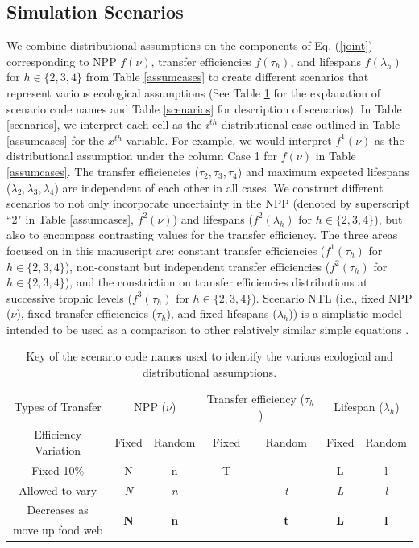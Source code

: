 \documentclass[oneside,12pt,final]{sty/ucthesis-CA2012}
\let\cite\citep                             %
\begin{document}
\begin{mainmatter}
\subsection{Simulation Scenarios}
We combine distributional assumptions on the components of Eq. (\ref{joint}) corresponding to NPP $f(\nu)$, transfer efficiencies $f(\tau_h)$, and lifespans $f(\lambda_h)$ for $h \in \{2, 3, 4\}$ from Table \ref{assumcases} to create different scenarios that represent various ecological assumptions (See Table \ref{scenariosids} for the explanation of scenario code names and Table \ref{scenarios} for description of scenarios). In Table \ref{scenarios}, we interpret each cell as the $i^{th}$ distributional case outlined in Table \ref{assumcases} for the $x^{th}$ variable. For example, we would interpret $f^1(\nu)$ as the distributional assumption under the column Case 1 for $f(\nu)$ in Table \ref{assumcases}. The transfer efficiencies ($\tau_2, \tau_3, \tau_4$) and maximum expected lifespans ($\lambda_2, \lambda_3, \lambda_4$) are independent of each other in all cases. We construct different scenarios to not only incorporate uncertainty in the NPP (denoted by superscript ``2" in Table \ref{assumcases}, $f^2(\nu)$) and lifespans ($f^2(\lambda_h)$ for $h \in \{2, 3, 4\}$), but also to encompass contrasting values for the transfer efficiency. The three areas focused on in this manuscript are: constant transfer efficiencies ($f^1(\tau_h)$ for $h \in \{2, 3, 4\}$), non-constant but independent transfer efficiencies ($f^2(\tau_h)$ for $h \in \{2, 3, 4\}$), and the constriction on transfer efficiencies distributions at successive trophic levels ($f^3(\tau_h)$ for $h \in \{2, 3, 4\}$). Scenario NTL (i.e., fixed NPP ($\nu$), fixed transfer efficiencies ($\tau_h$), and fixed lifespans ($\lambda_h$)) is a simplistic model intended to be used as a comparison to other relatively similar simple equations \cite{pauly1995primary, cury2005trophodynamic, chassot2010global, watson2014primary}. 

\begin{table}[H]
\centering
\caption{Key of the scenario code names used to identify the various ecological and distributional assumptions.}
\begin{tabular}{|c|cc|cc|cc|}
  \hline Types of Transfer  & \multicolumn{2}{c|}{NPP ($\nu$)} & \multicolumn{2}{c|}{Transfer efficiency ($\tau_h$)}  &  \multicolumn{2}{c|}{Lifespan ($\lambda_h$)}  \\ 
   Efficiency Variation & Fixed & Random & Fixed & Random & Fixed & Random  \\
    \hline
  Fixed 10\% & N & n & T &   & L & l \\
  Allowed to vary & \textit{N} & \textit{n} & & \textit{t} & \textit{L} & \textit{l} \\
  Decreases as  & \multirow{2}{*}{\textbf{N}} & \multirow{2}{*}{\textbf{n}} & & \multirow{2}{*}{\textbf{t}} & \multirow{2}{*}{\textbf{L}} & \multirow{2}{*}{\textbf{l}} \\
   move up food web & &  & &  & & \\
  \hline
\end{tabular} 
\label{scenariosids}
\end{table}


\end{mainmatter}
\end{document}
